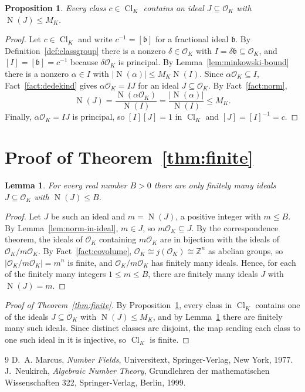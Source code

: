 \documentclass[11pt]{amsart}
\newtheorem{proposition}[theorem]{Proposition}
\newtheorem{lemma}[theorem]{Lemma}
\theoremstyle{definition}
\theoremstyle{remark}
\newcommand{\Z}{\mathbb{Z}}
\newcommand{\OK}{\mathcal{O}_K}
\newcommand{\Cl}{\operatorname{Cl}}
\newcommand{\Nm}{\operatorname{N}}
\begin{document}
\begin{proposition}\label{prop:small-ideal}
Every class $c \in \Cl_K$ contains an ideal $J \subseteq \OK$ with
$\Nm(J) \leq M_K$.
\end{proposition}

\begin{proof}
Let $c \in \Cl_K$ and write $c^{-1} = [\mathfrak{b}]$ for a fractional ideal
$\mathfrak{b}$. By Definition~\ref{def:classgroup} there is a nonzero
$\delta \in \OK$ with $I = \delta\mathfrak{b} \subseteq \OK$, and
$[I] = [\mathfrak{b}] = c^{-1}$ because $\delta\OK$ is principal. By
Lemma~\ref{lem:minkowski-bound} there is a nonzero $\alpha \in I$ with
$|\Nm(\alpha)| \leq M_K \Nm(I)$. Since $\alpha\OK \subseteq I$,
Fact~\ref{fact:dedekind} gives $\alpha\OK = IJ$ for an ideal
$J \subseteq \OK$. By Fact~\ref{fact:norm},
\[
  \Nm(J) = \frac{\Nm(\alpha\OK)}{\Nm(I)} = \frac{|\Nm(\alpha)|}{\Nm(I)}
  \leq M_K.
\]
Finally, $\alpha\OK = IJ$ is principal, so $[I][J] = 1$ in $\Cl_K$ and
$[J] = [I]^{-1} = c$.
\end{proof}

\section{Proof of Theorem~\ref{thm:finite}}\label{sec:proof}

\begin{lemma}\label{lem:finitely-many}
For every real number $B > 0$ there are only finitely many ideals
$J \subseteq \OK$ with $\Nm(J) \leq B$.
\end{lemma}

\begin{proof}
Let $J$ be such an ideal and $m = \Nm(J)$, a positive integer with
$m \leq B$. By Lemma~\ref{lem:norm-in-ideal}, $m \in J$, so
$m\OK \subseteq J$. By the correspondence theorem, the ideals of $\OK$
containing $m\OK$ are in bijection with the ideals of $\OK / m\OK$. By
Fact~\ref{fact:covolume}, $\OK \cong j(\OK) \cong \Z^n$ as abelian groups, so
$|\OK / m\OK| = m^n$ is finite, and $\OK/m\OK$ has finitely many ideals.
Hence, for each of the finitely many integers $1 \leq m \leq B$, there are
finitely many ideals $J$ with $\Nm(J) = m$.
\end{proof}

\begin{proof}[Proof of Theorem~\ref{thm:finite}]
By Proposition~\ref{prop:small-ideal}, every class in $\Cl_K$ contains one of
the ideals $J \subseteq \OK$ with $\Nm(J) \leq M_K$, and by
Lemma~\ref{lem:finitely-many} there are finitely many such ideals. Since
distinct classes are disjoint, the map sending each class to one such ideal
in it is injective, so $\Cl_K$ is finite.
\end{proof}

\begin{thebibliography}{9}
 D.~A. Marcus, \emph{Number Fields}, Universitext,
  Springer-Verlag, New York, 1977.
 J.~Neukirch, \emph{Algebraic Number Theory}, Grundlehren der
  mathematischen Wissenschaften 322, Springer-Verlag, Berlin, 1999.
\end{thebibliography}
\end{document}
